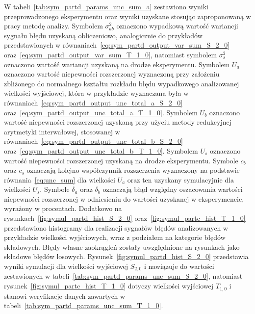 W tabeli~\ref{tab:sym_partd_params_unc_sum_a} zestawiono wyniki przeprowadzonego eksperymentu oraz wyniki uzyskane stosując zaproponowaną w pracy metodę analizy. Symbolem $\sigma_{ab}^{2}$ oznaczono wypadkową wartość wariancji sygnału błędu uzyskaną obliczeniowo, analogicznie do przykładów przedstawionych w równaniach~\eqref{eq:sym_partd_output_var_sum_S_2_0} oraz~\eqref{eq:sym_partd_output_var_sum_T_1_0}, natomiast symbolem $\sigma_{s}^{2}$ oznaczono wartość wariancji uzyskaną na drodze eksperymentu. Symbolem $U_{a}$ oznaczono wartość niepewności rozszerzonej wyznaczoną przy założeniu zbliżonego do normalnego kształtu rozkładu błędu wypadkowego analizowanej wielkości wyjściowej, która w przykładzie wyznaczana była w równaniach~\eqref{eq:sym_partd_output_unc_total_a_S_2_0} oraz~\eqref{eq:sym_partd_output_unc_total_a_T_1_0}. Symbolem $U_{b}$ oznaczono wartość niepewności rozszerzonej uzyskaną przy użyciu metody redukcyjnej arytmetyki interwałowej, stosowanej w równaniach~\eqref{eq:sym_partd_output_unc_total_b_S_2_0} oraz~\eqref{eq:sym_partd_output_unc_total_b_T_1_0}. Symbolem $U_{s}$ oznaczono wartość niepewności rozszerzonej uzyskaną na drodze eksperymentu. Symbole $c_{b}$ oraz $c_{s}$ oznaczają kolejno współczynnik rozszerzenia wyznaczony na podstawie równania~\eqref{eq:unc_sum} dla wielkości $U_{a}$ oraz ten uzyskany symulacyjnie dla wielkości $U_{s}$. Symbole $\delta_{a}$ oraz $\delta_{b}$ oznaczają błąd względny oszacowania wartości niepewności rozszerzonej w odniesieniu do wartości uzyskanej w eksperymencie, wyrażony w procentach. Dodatkowo na rysunkach~\ref{fig:symul_partd_hist_S_2_0} oraz~\ref{fig:symul_partc_hist_T_1_0} przedstawiono histogramy dla realizacji sygnałów błędów analizowanych w przykładzie wielkości wyjściowych, wraz z podziałem na kategorie błędów składowych. Błędy własne zaokrągleń zostały uwzględnione na rysunkach jako składowe błędów losowych. Rysunek~\ref{fig:symul_partd_hist_S_2_0} przedstawia wyniki symulacji dla wielkości wyjściowej $S_{2,0}$ i nawiązuje do wartości zestawionych w tabeli~\ref{tab:sym_partd_params_unc_sum_S_2_0}, natomiast rysunek~\ref{fig:symul_partc_hist_T_1_0} dotyczy wielkości wyjściowej $T_{1,0}$ i stanowi weryfikacje danych zawartych w tabeli~\ref{tab:sym_partd_params_unc_sum_T_1_0}.

